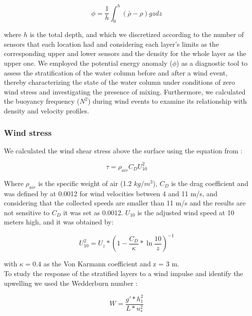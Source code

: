 \documentclass[tesis.tex]{subfiles}
\begin{document}
\begin{equation}
    \phi=\frac{1}{h}\int^h_0(\bar{\rho}-\rho)gzdz
    \label{eq: phi}
\end{equation}

where $h$ is the total depth, and which we discretized according to the number of sensors that each location had and considering each layer's limits as the corresponding upper and lower sensors and the density for the whole layer as the upper one. We employed the potential energy anomaly ($\phi$) as a diagnostic tool to assess the stratification of the water column before and after a wind event, thereby characterizing the state of the water column under conditions of zero wind stress and investigating the presence of mixing. Furthermore, we calculated the buoyancy frequency ($N^2$) during wind events to examine its relationship with density and velocity profiles.

\subsubsection{Wind stress}

We calculated the wind shear stress above the surface using the equation from \cite{read2011derivation}: 

\begin{equation}
    \tau=\rho_{air} C_D U_{10}^2
    \label{eq: tau}
\end{equation}

Where $\rho_{air}$ is the specific weight of air (1.2 $kg/m^3$), $C_D$ is the drag coefficient and was defined by \cite{large1981open} at 0.0012 for wind velocities between 4 and 11 m/s, and considering that the collected speeds are smaller than 11 m/s and the results are not sensitive to $C_D$ it was set as 0.0012. $U_{10}$ is the adjusted wind speed at 10 meters high, and it was obtained by: 

\begin{equation}
    U_{10}^2=U_z*(1-\frac{C_D}{\kappa}*\ln{\frac{10}{z}})^{-1}
    \label{eq: adjvel}
\end{equation}

with $\kappa=0.4$ as the Von Karmann coefficient and z = 3 m.\\

To study the response of the stratified layers to a wind impulse and identify the upwelling we used the Wedderburn number \citep{Shintani2010}:

\begin{equation}
    W=\frac{g'*h_1^2}{L*u_*^2}
    \label{eq: wed}
\end{equation}
\end{document}
